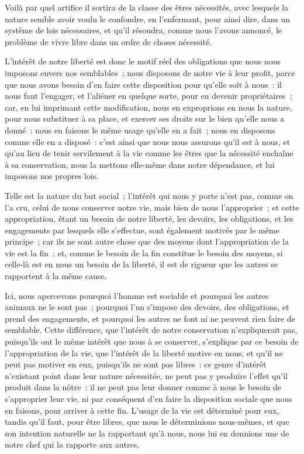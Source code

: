 \documentclass[french,twoside]{book} %
\begin{document}
Voilà par quel artifice il sortira de la classe des êtres nécessités, avec lesquels la nature semble avoir voulu le confondre, en l’enfermant, pour ainsi dire, dans un système de lois nécessaires, et qu’il résoudra, comme nous l’avons annoncé, le problème de vivre libre dans un ordre de choses nécessité.\par
L’intérêt de notre liberté est donc le motif réel des obligations que nous nous imposons envers nos semblables ; nous disposons de notre vie à leur profit, parce que nous avons besoin d’en faire cette disposition pour qu’elle soit à nous : il nous faut l’engager, et l’aliéner en quelque sorte, pour en devenir propriétaires ; car, en lui imprimant cette modification, nous en exproprions en nous la nature, pour nous substituer à sa place, et exercer ses droits sur le bien qu’elle nous a donné : nous en faisons le même usage qu’elle en a fait ; nous en disposons comme elle en a disposé : c’est ainsi que nous nous assurons qu’il est à nous, et qu’au lieu de tenir servilement à la vie comme les êtres que la nécessité enchaîne à sa conservation, nous la mettons elle-même dans notre dépendance, et lui imposons nos propres lois.\par
Telle est la nature du but social ; l’intérêt qui nous y porte n’est pas, comme on l’a cru, celui de nous conserver notre vie, mais bien de nous l’approprier ; et cette appropriation, étant un besoin de notre liberté, les devoirs, les obligations, et les engagements par lesquels elle s’effectue, sont également motivés par le même principe ; car ils ne sont autre chose que des moyens dont l’appropriation de la vie est la fin ; et, comme le besoin de la fin constitue le besoin des moyens, si celle-là est en nous un besoin de la liberté, il est de rigueur que les autres se rapportent à la même cause.\par
Ici, nous apercevons pourquoi l’homme est sociable et pourquoi les autres animaux ne le sont pas ; pourquoi l’un s’impose des devoirs, des obligations, et prend des engagements, et pourquoi les autres ne font ni ne peuvent rien faire de semblable. Cette différence, que l’intérêt de notre conservation n’expliquerait pas, puisqu’ils ont le même intérêt que nous à se conserver, s’explique par ce besoin de l’appropriation de la vie, que l’intérêt de la liberté motive en nous, et qu’il ne peut pas motiver en eux, puisqu’ils ne sont pas libres : ce genre d’intérêt n’existant point dans leur nature nécessitée, ne peut pas y produire l’effet qu’il produit dans la nôtre : il ne peut pas leur donner comme à nous le besoin de s’approprier leur vie, ni par conséquent d’en faire la disposition sociale que nous en faisons, pour arriver à cette fin. L’usage de la vie est déterminé pour eux, tandis qu’il faut, pour être libres, que nous le déterminions nous-mêmes, et que son intention naturelle ne la rapportant qu’à nous, nous lui en donnions une de notre chef qui la rapporte aux autres.\par
\end{document}

